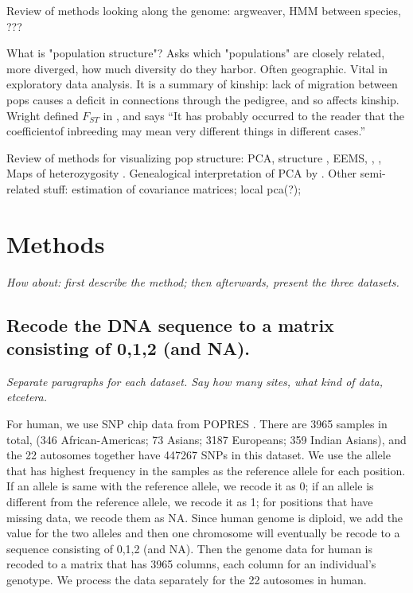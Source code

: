 \documentclass[11pt, oneside]{article}   	%
\newcommand{\plr}[1]{{\em \color{blue} #1}}
\begin{document}
Review of methods looking along the genome:
argweaver, HMM between species, ???

What is "population structure"?
Asks which "populations" are closely related, more diverged, how much diversity do they harbor.
Often geographic.
Vital in exploratory data analysis.
It is a summary of kinship: 
lack of migration between pops causes a deficit in connections through the pedigree,
and so affects kinship.
Wright defined $F_{ST}$ in \citep{wright1949genetical}, and says ``It has probably occurred to the reader that the coefficientof inbreeding may mean very different
things in different cases.''

Review of methods for visualizing pop structure:
PCA, structure \citep{falush2003inference}, EEMS, \citep{petkova2014visualizing}, \citep{yang2012modelbased},
Maps of heterozygosity \citep{ramachandran2005support}.
Genealogical interpretation of PCA by \citet{mcvean2009genealogical}.
Other semi-related stuff:
estimation of covariance matrices;
local pca(?);



\section{Methods}

\plr{How about: first describe the method; then afterwards, present the three datasets.}

\subsection{Recode the DNA sequence to a matrix consisting of 0,1,2 (and NA).}

\plr{Separate paragraphs for each dataset. Say how many sites, what kind of data, etcetera.}

For human, we use SNP chip data from POPRES \citet{nelson2008population}. There are 3965 samples in total, (346 African-Americas; 73 Asians; 3187 Europeans; 359 Indian Asians), and the 22 autosomes together have 447267 SNPs in this dataset. 
We use the allele that has highest frequency in the samples as the reference allele for each position. 
If an allele is same with the reference allele, we recode it as 0; if an allele is different from the reference allele, we recode it as 1; for positions that have missing data, we recode them as NA. 
Since human genome is diploid, we add the value for the two alleles and then one chromosome will eventually be recode to a sequence consisting of 0,1,2 (and NA).
Then the genome data for human is recoded to a matrix that has 3965 columns, each column for an individual's genotype. 
We process the data separately for the 22 autosomes in human.
\end{document}
